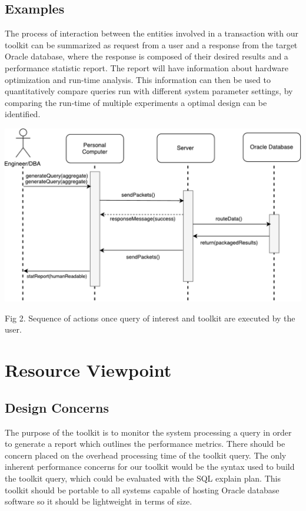 \documentclass[draftclsnofoot, onecolumn, compsoc, 10pt]{IEEEtran}
\begin{document}
\subsection{Examples}
The process of interaction between the entities involved in a transaction with our toolkit can be summarized as request from a user and a response from the target Oracle database, where the response is composed of their desired results and a performance statistic report.
The report will have information about hardware optimization and run-time analysis.
This information can then be used to quantitatively compare queries run with different system parameter settings, by comparing the run-time of multiple experiments a optimal design can be identified. 

\begin{center}
	\includegraphics[width=6in]{Sequence_Diagram.pdf}

	Fig 2. Sequence of actions once query of interest and toolkit are executed by the user.
\end{center}


\section{Resource Viewpoint}
\subsection{Design Concerns}
The purpose of the toolkit is to monitor the system processing a query in order to generate a report which outlines the performance metrics.
There should be concern placed on the overhead processing time of the toolkit query.
The only inherent performance concerns for our toolkit would be the syntax used to build the toolkit query, which could be evaluated with the SQL explain plan. This toolkit should be portable to all systems capable of hosting Oracle database software so it should be lightweight in terms of size. 
\end{document}
